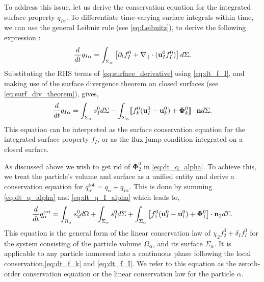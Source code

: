 To address this issue, let us derive the conservation equation for the integrated surface property $q_{I\alpha}$.
To differentiate time-varying surface integrals within time, we can use the general Leibniz rule (see \ref{eq:Leibnitz}), to derive the following expression :
\begin{equation}
    \frac{d}{d t}  q_{I\alpha}
    = \int_{\Sigma_\alpha} \left[
        \partial_t f_I^0
        +   \mathbf{\nabla}_{||} \cdot (\textbf{u}_I^0f_I^0)
    \right]d\Sigma.
    \label{eq:surface_derivative}
\end{equation}
Substituting the RHS terms of \ref{eq:surface_derivative} using \ref{eq:dt_f_I}, and making use of the surface divergence theorem on closed surfaces (see \ref{eq:surf_div_theorem}), gives,
\begin{equation}
    \frac{d}{d t}  q_{I\alpha}
    = \int_{\Sigma_\alpha} 
        s_I^0
    d\Sigma
    - \int_{\Sigma_\alpha} \llbracket 
        f_k^0 (\textbf{u}_I^0 - \textbf{u}_k^0)
        + \mathbf{\Phi}_k^0
     \rrbracket \cdot \textbf{n}
    d\Sigma.
    \label{eq:dt_q_I_alpha}
\end{equation}
This equation can be interpreted as the surface conservation equation for the integrated surface property $f_I$, or as the flux jump condition integrated on a closed surface. 

As discussed above we wish to get rid of $\mathbf{\Phi}_2^0$ in \ref{eq:dt_q_alpha}. To achieve this, we treat the particle's volume and surface as a unified entity and derive a conservation equation for $q_\alpha^\text{tot} = q_\alpha + q_{I\alpha}$. 
This is done by summing \ref{eq:dt_q_alpha} and \ref{eq:dt_q_I_alpha} which leads to, 
\begin{equation}
    \frac{d}{d t}  q_\alpha^\text{tot}
    = 
    \int_{\Omega_\alpha} s_2^0 d\Omega
    + \int_{\Sigma_\alpha} s_I^0 d\Sigma
    + \int_{\Sigma_\alpha} \left[
        f_1^0 (\textbf{u}_I^0-\textbf{u}_1^0) 
        + \mathbf{\Phi}_1^0 
        \right] \cdot \textbf{n}_2 d\Sigma. 
    \label{eq:dt_q_alpha_tot}
\end{equation}
This equation is the general form of the linear conservation law of $\chi_2 f_2^0 + \delta_I f_I^0$ for the system consisting of the particle volume $\Omega_\alpha$, and its surface $\Sigma_\alpha$. It is applicable to any particle immersed into a continuous phase following the local conservation,\ref{eq:dt_f_k} and \ref{eq:dt_f_I}.
We refer to this equation as the zeroth-order conservation equation or the linear conservation law for the particle $\alpha$.

